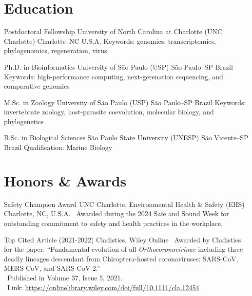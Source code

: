 \documentclass[11pt, letterpaper, sans]{moderncv}
\begin{document}


\restoregeometry

\clearpage


\section{Education}

		{Postdoctoral Fellowship}
		{University of North Carolina at Charlotte (UNC Charlotte)}
		{Charlotte--NC}
		{U.S.A.}
		{Keywords: genomics, transcriptomics, phylogenomics, regeneration, virus}
	
		{Ph.D. in Bioinformatics}
		{University of São Paulo (USP)}
		{São Paulo--SP}
		{Brazil}
		{Keywords: high-performance computing, next-gerenation sequencing, and comparative genomics}

		{M.Sc. in Zoology}
		{University of São Paulo (USP)}
		{São Paulo--SP}
		{Brazil}
		{Keywords: invertebrate zoology, host-parasite coevolution, molecular biology, and phylogenetics}

		{B.Sc. in Biological Sciences}
		{São Paulo State University (UNESP)}
		{São Vicente--SP}
		{Brazil}
		{Qualification: Marine Biology}


\section{Honors \& Awards}

    {Safety Champion Award}
    {UNC Charlotte, Environmental Health \& Safety (EHS)}
    {Charlotte, NC, U.S.A.}
    {}
    {\textbullet~Awarded during the 2024 Safe and Sound Week for outstanding commitment to safety and health practices in the workplace.}

    {Top Cited Article (2021-2022)}
    {Cladistics, Wiley}
    {Online}
    {}
    {
        \textbullet~Awarded by Cladistics for the paper: ``Fundamental evolution of all \textit{Orthocoronavirinae} including three deadly lineages descendant from Chiroptera-hosted coronaviruses: SARS-CoV, MERS-CoV, and SARS-CoV-2.''\\
        \textbullet~Published in Volume 37, Issue 5, 2021.\\
        \textbullet~Link: \url{https://onlinelibrary.wiley.com/doi/full/10.1111/cla.12454}
    }
\end{document}
